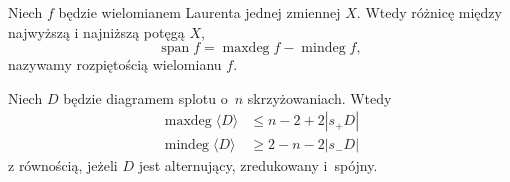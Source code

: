\begin{definition}[rozpiętość]
    Niech $f$ będzie wielomianem Laurenta jednej zmiennej $X$.
    Wtedy różnicę między najwyższą i najniższą potęgą $X$,
    \begin{equation}
        \operatorname{span} f = \operatorname{maxdeg} f - \operatorname{mindeg} f,
    \end{equation}
    nazywamy rozpiętością wielomianu $f$.
\end{definition}

 \begin{lemma}
    \label{lem:pretait_lemma_2}
    Niech $D$ będzie diagramem splotu o~$n$ skrzyżowaniach.
    Wtedy
    \begin{align}
        \operatorname{maxdeg} \langle D \rangle & \le n - 2 + 2|s_+D| \\
        \operatorname{mindeg} \langle D \rangle & \ge 2 - n - 2|s_-D|
    \end{align}
    z równością, jeżeli $D$ jest alternujący, zredukowany i~spójny.
\end{lemma}

